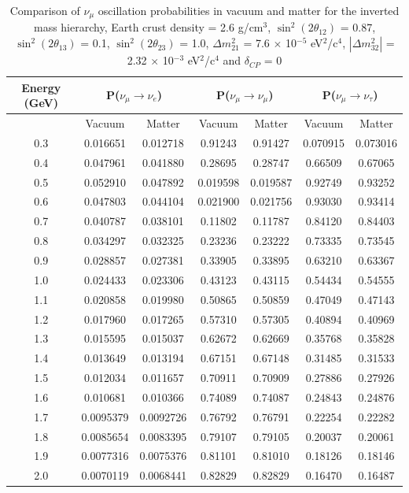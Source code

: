\begin{table}
\caption[Comparison of $\nu_{\mu}$ oscillation probabilities in vacuum and matter for the inverted mass hierarchy]
{Comparison of $\nu_{\mu}$ oscillation probabilities in vacuum and matter for the inverted mass hierarchy, Earth crust
density = 2.6 g/cm$^{3}$, $ \sin^{2}(2 \theta_{12})$ = 0.87, $\sin^{2}(2 \theta_{13})$ = 0.1, $\sin^{2}(2 \theta_{23})$ = 1.0,
$\Delta m_{21}^{2}$ = 7.6 $\times$ 10$^{-5}$ eV$^{2}$/c$^{4}$, $|\Delta m_{32}^{2}|$ = 2.32 $\times$ 10$^{-3}$ eV$^{2}$/c$^{4}$ and $\delta_{CP}$ = 0}
\centering
\begin{tabular}{| c | c | c | c | c | c | c |}
\hline
Energy (GeV) & \multicolumn{2}{|c|}{P($\nu_{\mu} \rightarrow \nu_{e}$)} & \multicolumn{2}{|c|}{P($\nu_{\mu} \rightarrow \nu_{\mu}$)} & \multicolumn{2}{|c|}{P($\nu_{\mu} \rightarrow \nu_{\tau}$)}\\
\hline
 & Vacuum & Matter & Vacuum & Matter & Vacuum & Matter \\
\hline
0.3 &  0.016651 &  0.012718 &  0.91243 &  0.91427 &  0.070915 &  0.073016\\
\hline
0.4 &  0.047961 &  0.041880 &  0.28695 &  0.28747 &  0.66509 &  0.67065\\
\hline
0.5 &   0.052910 &  0.047892 &  0.019598 &   0.019587 &  0.92749 &  0.93252\\
\hline
0.6 &  0.047803 &  0.044104 &  0.021900 &  0.021756 &  0.93030 &  0.93414\\
\hline
0.7 &  0.040787 &  0.038101 &  0.11802 &   0.11787 &  0.84120 &  0.84403\\
\hline
0.8 &  0.034297 &  0.032325 &  0.23236 &  0.23222 &  0.73335 &  0.73545\\
\hline
0.9 &  0.028857 &  0.027381 &  0.33905 &  0.33895 &  0.63210 &  0.63367\\
\hline
1.0 &  0.024433 &  0.023306 &  0.43123 &  0.43115 &  0.54434 &  0.54555\\
\hline
1.1 &  0.020858 &  0.019980 &  0.50865 &  0.50859 &  0.47049 &  0.47143\\
\hline
1.2 &  0.017960 &  0.017265 &  0.57310 &  0.57305 &  0.40894 &  0.40969\\
\hline
1.3 &  0.015595 &  0.015037 &  0.62672 &  0.62669 &  0.35768 &  0.35828\\
\hline
1.4 &  0.013649 &  0.013194 &  0.67151 &  0.67148 &  0.31485 &  0.31533\\
\hline
1.5 &  0.012034 &  0.011657 &  0.70911 &  0.70909 &  0.27886 &  0.27926\\
\hline
1.6 &  0.010681 &  0.010366 &  0.74089 &  0.74087 &  0.24843 &  0.24876\\
\hline
1.7 &  0.0095379 &  0.0092726 &  0.76792 & 0.76791 &  0.22254 &  0.22282\\
\hline
1.8 &  0.0085654 &  0.0083395 &  0.79107 &  0.79105 &  0.20037 &  0.20061\\
\hline
1.9 &   0.0077316 &  0.0075376 &  0.81101 &  0.81010 &  0.18126 &  0.18146\\
\hline
2.0 &  0.0070119 &  0.0068441 &  0.82829 &  0.82829 &  0.16470 &  0.16487\\
\hline
\end{tabular}
\label{numuOscMatterEffectsIH}
\end{table}

